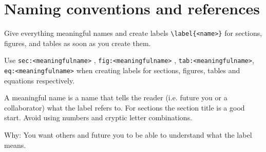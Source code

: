 \section{Naming conventions and references}\label{sec:namingConventions}
Give everything meaningful names and create labels \verb|\label{<name>}| for sections, figures, and tables as soon as you create them.

Use \texttt{sec:<meaningfulname>} , \texttt{fig:<meaningfulname>} , \texttt{tab:<meaningfulname>}, \texttt{eq:<meaningfulname>} when creating labels for sections, figures, tables and equations respectively.

A meaningful name is a name that tells the reader (i.e. future you or a collaborator) what the label refers to. For sections the section title is a good start. Avoid using numbers and cryptic letter combinations.

Why: You want others and future you to be able to understand what the label means.

